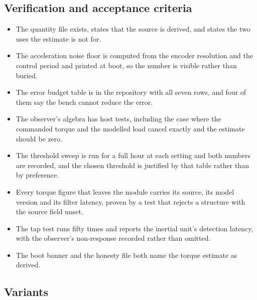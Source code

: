 \subsection*{Verification and acceptance criteria}

\begin{itemize}
\item The quantity file exists, states that the source is derived, and states
the two uses the estimate is not for.
\item The acceleration noise floor is computed from the encoder resolution and
the control period and printed at boot, so the number is visible rather than
buried.
\item The error budget table is in the repository with all seven rows, and four
of them say the bench cannot reduce the error.
\item The observer's algebra has host tests, including the case where the
commanded torque and the modelled load cancel exactly and the estimate should be
zero.
\item The threshold sweep is run for a full hour at each setting and both
numbers are recorded, and the chosen threshold is justified by that table rather
than by preference.
\item Every torque figure that leaves the module carries its source, its model
version and its filter latency, proven by a test that rejects a structure with
the source field unset.
\item The tap test runs fifty times and reports the inertial unit's detection
latency, with the observer's non-response recorded rather than omitted.
\item The boot banner and the honesty file both name the torque estimate as
derived.
\end{itemize}

\subsection*{Variants}

